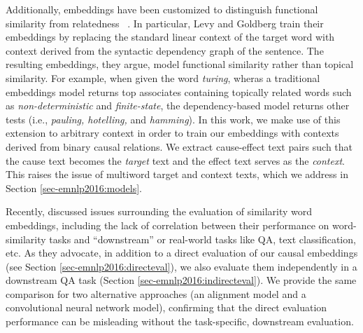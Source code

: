 Additionally, embeddings have been customized to distinguish functional similarity from relatedness ~\citep{levy2014dependency,kielaspecializing}.
In particular, Levy and Goldberg train their embeddings by replacing the standard linear context of the target word with context derived from the syntactic dependency graph of the sentence.  The resulting embeddings, they argue, model functional similarity rather than topical similarity.  For example, when given the word \emph{turing}, wheras a traditional embeddings model returns top associates containing topically related words such as \emph{non-deterministic} and \emph{finite-state}, the dependency-based model returns other tests (i.e., \emph{pauling, hotelling,} and \emph{hamming}).
In this work, we make use of this extension to arbitrary context in order to train our embeddings with contexts derived from binary causal relations.  We extract cause-effect text pairs such that the cause text becomes the \emph{target} text and the effect text serves as the \emph{context}. This raises the issue of multiword target and context texts, which we address in Section \ref{sec-emnlp2016:models}.

Recently, \citet{faruqui2016problems} discussed issues surrounding the evaluation of similarity word embeddings, including the lack of correlation between their performance on word-similarity tasks and ``downstream'' or real-world tasks like QA, text classification, etc.  As they advocate, in addition to a direct evaluation of our causal embeddings (see Section \ref{sec-emnlp2016:directeval}), we also evaluate them independently in a downstream QA task (Section \ref{sec-emnlp2016:indirecteval}).  We provide the same comparison for two alternative approaches (an alignment model and a convolutional neural network model), confirming that the direct evaluation performance can be misleading without the task-specific, downstream evaluation.

